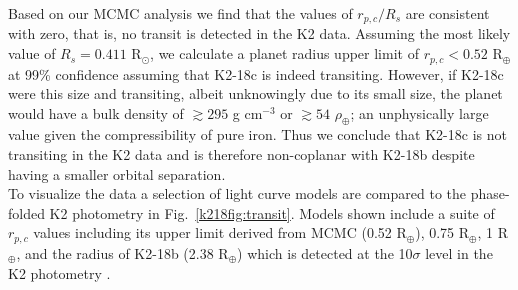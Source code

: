 Based on our MCMC analysis we find that the values of $r_{p,c}/R_s$ are consistent with zero,
that is, no transit is detected in the K2 data.
Assuming the most likely value of $R_s = 0.411$ R$_{\odot}$, 
we calculate a planet radius upper limit of $r_{p,c} < 0.52$ R$_{\oplus}$ at 99\% confidence assuming 
that K2-18c is indeed transiting. However, if K2-18c were this size and  
transiting, albeit unknowingly due to its small size, the planet would have a bulk density
of $\gtrsim 295$ g cm$^{-3}$ or $\gtrsim 54$ $\rho_{\oplus}$; an unphysically large value given
the compressibility of pure iron. Thus
we conclude that K2-18c is not transiting in the K2 data and is therefore non-coplanar with
K2-18b despite having a smaller orbital separation. \\

To visualize the data a selection of light
curve models are compared to the phase-folded K2 photometry in Fig.~\ref{k218fig:transit}. Models shown
include a suite of $r_{p,c}$ values including its upper limit derived from MCMC (0.52 R$_{\oplus}$),
0.75 R$_{\oplus}$, 1 R$_{\oplus}$, and the radius of K2-18b (2.38 R$_{\oplus}$) which is detected at
the 10$\sigma$ level in the K2 photometry \citep{montet15}. 

